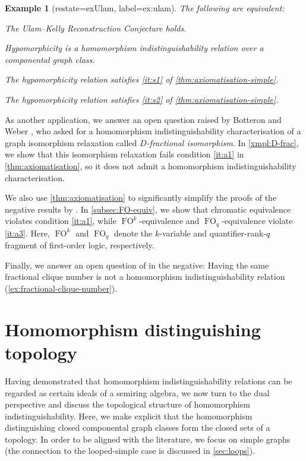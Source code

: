 \documentclass[11pt]{scrartcl}
\theoremstyle{definition}
\theoremstyle{plain}
\newtheorem{example}[definition]{Example}
\theoremstyle{remark}
\begin{document}
	\begin{example}[restate=exUlam, label=ex:ulam]
		The following are equivalent:
		\begin{assertions}
			\item\label{it:ulam1} The Ulam--Kelly Reconstruction Conjecture holds.
			\item\label{it:ulam2} Hypomorphicity is a homomorphism indistinguishability relation over a componental graph class.
			\item\label{it:ulam3} The hypomorphicity relation satisfies \cref{it:s1} of \cref{thm:axiomatisation-simple}.
			\item\label{it:ulam4} The hypomorphicity relation satisfies \cref{it:s2} of \cref{thm:axiomatisation-simple}.
		\end{assertions}
	\end{example}

    As another application, we answer an open question raised by Botteron and Weber \cite[Open Question 2]{botteron_communication_2024}, who asked for a homomorphism indistinguishability characterisation of a graph isomorphism relaxation called \emph{$D$\nobreakdash-fractional isomorphism}.
    In \cref{xmpl:D-frac}, we show that this isomorphism relaxation fails condition \ref{it:a1} in \cref{thm:axiomatisation}, so it does not admit a homomorphism indistinguishability characterisation.
	
	We also use \cref{thm:axiomatisation} to significantly simplify the proofs of the negative results by \textcite{atserias_expressive_2021}. In \cref{subsec:FO-equiv}, we show that chromatic equivalence violates condition \ref{it:a1}, while $\operatorname{FO}^k$-equivalence and $\operatorname{FO}_q$-equivalence violate \ref{it:a3}.
    Here, $\operatorname{FO}^k$ and $\operatorname{FO}_q$ denote the $k$-variable and quantifier-rank-$q$ fragment of first-order logic, respectively.

    Finally, we answer an open question of \textcite{atserias_expressive_2021} in the negative: Having the same fractional clique number is not a homomorphism indistinguishability relation (\cref{ex:fractional-clique-number}).
    
	\section{Homomorphism distinguishing topology}
    \label{sec:topology}

	Having demonstrated that homomorphism indistinguishability relations can be regarded as certain ideals of a semiring algebra, we now turn to the dual perspective and discuss the topological structure of homomorphism indistinguishability.
	Here, we make explicit that the homomorphism distinguishing closed componental graph classes form the closed sets of a topology. 
	In order to be aligned with the literature, we focus on simple graphs (the connection to the looped-simple case is discussed in \cref{sec:loops}).
\end{document}
